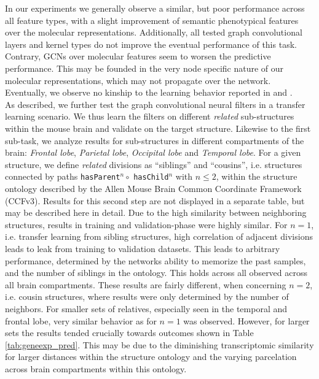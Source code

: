 \documentclass[]{article}
\begin{document}
In our experiments we generally observe a similar, but poor performance across all feature types, with a slight improvement of semantic phenotypical features over the molecular representations. Additionally, all tested graph convolutional layers and kernel types do not improve the eventual performance of this task. Contrary, GCNs over molecular features seem to worsen the predictive performance. This may be founded in the very node specific nature of our molecular representations, which may not propagate over the network. Eventually, we observe no kinship to the learning behavior reported in \citet{schulte2021integration} and \citet{wang2021mogonet}.\\

As described, we further test the graph convolutional neural filters in a transfer learning scenario. We thus learn the filters on different \textit{related} sub-structures within the mouse brain and validate on the target structure. Likewise to the first sub-task, we analyze results for sub-structures in different compartments of the brain: \textit{Frontal lobe}, \textit{Parietal lobe}, \textit{Occipital lobe } and \textit{Temporal lobe}.
For a given structure, we define \textit{related} divisions as ``siblings'' and ``cousins'', i.e. structures connected by paths \verb*|hasParent|$^n \circ$ \verb*|hasChild|$^n$ with $n\leq2$, within the structure ontology described by the Allen Mouse Brain Common Coordinate Framework (CCFv3). 
Results for this second step are not displayed in a separate table, but may be described here in detail. Due to the high similarity between neighboring structures, results in training and validation-phase were highly similar. For $n=1$, i.e. transfer learning from sibling structures, high correlation of adjacent divisions leads to leak from training to validation datasets. This leads to arbitrary performance, determined by the networks ability to memorize the past samples, and the number of siblings in the ontology. This holds across all observed across all brain compartments.
These results are fairly different, when concerning $n=2$, i.e. cousin structures, where results were only determined by the number of neighbors. For smaller sets of relatives, especially seen in the temporal and frontal lobe, very similar behavior as for $n=1$ was observed. However, for larger sets the results tended crucially towards outcomes shown in Table \ref{tab:geneexp_pred}. This may be due to the diminishing transcriptomic similarity for larger distances within the structure ontology and the varying parcelation across brain compartments within this ontology. \\
\end{document}
